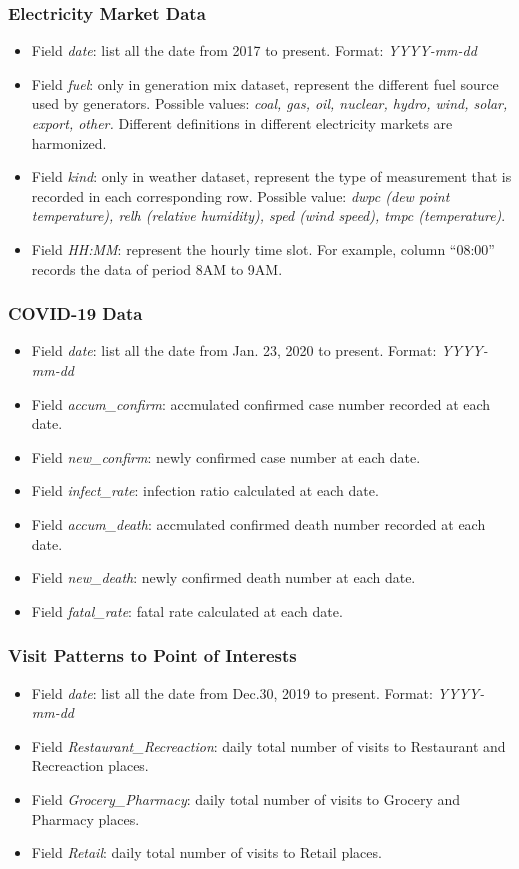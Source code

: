 \documentclass[10pt]{article}
\numberwithin{equation}{section}
\numberwithin{table}{section}
\numberwithin{figure}{section}
\begin{document}
\subsubsection{Electricity Market Data}
\begin{itemize}
	\item Field \textit{date}: list all the date from 2017 to present. Format: \textit{YYYY-mm-dd}
	\item Field \textit{fuel}: only in generation mix dataset, represent the different fuel source used by generators. Possible values: \textit{coal, gas, oil, nuclear, hydro, wind, solar, export, other.} Different definitions in different electricity markets are harmonized.
	\item Field \textit{kind}: only in weather dataset, represent the type of measurement that is recorded in each corresponding row. Possible value: \textit{dwpc (dew point temperature), relh (relative humidity), sped (wind speed), tmpc (temperature)}.
	\item Field \textit{HH:MM}: represent the hourly time slot. For example, column ``08:00'' records the data of period 8AM to 9AM.
\end{itemize}
\subsubsection{COVID-19 Data}
\begin{itemize}
	\item Field \textit{date}: list all the date from Jan. 23, 2020 to present. Format: \textit{YYYY-mm-dd}
	\item Field \textit{accum\_confirm}: accmulated confirmed case number recorded at each date.
	\item Field \textit{new\_confirm}: newly confirmed case number at each date.
	\item Field \textit{infect\_rate}: infection ratio calculated at each date.
	\item Field \textit{accum\_death}: accmulated confirmed death number recorded at each date.
	\item Field \textit{new\_death}: newly confirmed death number at each date.
	\item Field \textit{fatal\_rate}: fatal rate calculated at each date.
\end{itemize}
\subsubsection{Visit Patterns to Point of Interests}
\begin{itemize}
	\item Field \textit{date}: list all the date from Dec.30, 2019 to present. Format: \textit{YYYY-mm-dd}
	\item Field \textit{Restaurant\_Recreaction}: daily total number of visits to Restaurant and Recreaction places. 
	\item Field \textit{Grocery\_Pharmacy}: daily total number of visits to Grocery and Pharmacy places.
	\item Field \textit{Retail}: daily total number of visits to Retail places. 
\end{itemize}
\end{document}
